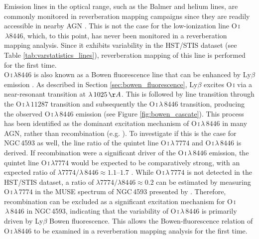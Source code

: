 Emission lines in the optical range, such as the Balmer and helium lines, are commonly monitored in reverberation mapping campaigns since they are readily accessible in nearby AGN \parencite{peterson1991steps, kollatschny1997balmer}.  This is not the case for the low-ionization line O\,\textsc{i}$\,\lambda 8446$, which, to this point, has never been monitored in a reverberation mapping analysis. Since it exhibits variability in the HST/STIS dataset (see Table \ref{tab:varstatistics_lines}), reverberation mapping of this line is performed for the first time.\\ O\,\textsc{i}$\,\lambda 8446$ is also known as a Bowen fluorescence line that can be enhanced by Ly$\beta$ emission \parencite{grandi1980}. As described in Section \ref{sec:bowen_fluorescence}, Ly$\beta$ excites O\,\textsc{i} via a near-resonant transition at $\lambda\,1025\,\AA$. This is followed by line transition through the O\,\textsc{i}\,$\lambda\,11287$ transition and subsequently the O\,\textsc{i}\,$\lambda\,8446$ transition, producing the observed O\,\textsc{i}\,$\lambda\,8446$ emission (see Figure \ref{fig:bowen_cascate}). This process has been identified as the dominant excitation mechanism of O\,\textsc{i}\,$\lambda\,8446$ in many AGN, rather than recombination (e.g. \cite{rudy1989detection, rodriguez2002oi, landt2008near}). To investigate if this is the case for NGC\,4593 as well, the line ratio of the quintet line O\,\textsc{i}\,$\lambda\,7774$ and O\,\textsc{i}\,$\lambda\,8446$ is derived. If recombination were a significant driver of the O\,\textsc{i}\,$\lambda\,8446$ emission, the quintet line O\,\textsc{i}\,$\lambda 7774$ would be expected to be comparatively strong, with an expected ratio of $\lambda7774/\lambda\,8446 \approx 1.1\text{--}1.7$ \parencite{grandi1980, landt2008near}. While O\,\textsc{i}\,$\lambda\,7774$ is not detected in the HST/STIS dataset, a ratio of $\lambda7774/\lambda8446 \approx 0.2$ can be estimated by measuring O\,\textsc{i}\,$\lambda\,7774$ in the MUSE spectrum of NGC\,4593 presented by \cite{Ochmann_2025}. Therefore, recombination can be excluded as a significant excitation mechanism for O\,\textsc{i}$\,\lambda\,8446$ in NGC\,4593, indicating that the variability of O\,\textsc{i}$\,\lambda\,8446$ is primarily driven by Ly$\beta$ Bowen fluorescence. This allows the Bowen-fluorescence relation of O\,\textsc{i}\,$\lambda 8446$ to be examined in a reverberation mapping analysis for the first time. \\
